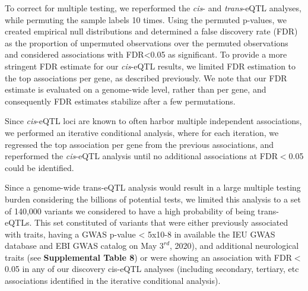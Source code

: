 To correct for multiple testing, we reperformed the \emph{cis}- and \emph{trans}-eQTL analyses, while permuting the sample labels 10 times. Using the permuted p-values, we created empirical null distributions and determined a false discovery rate (FDR) as the proportion of unpermuted observations over the permuted observations and considered associations with FDR<0.05 as significant. To provide a more stringent FDR estimate for our \emph{cis}-eQTL results, we limited FDR estimation to the top associations per gene, as described previously\cite{vosaUnravelingPolygenicArchitecture2018}. We note that our FDR estimate is evaluated on a genome-wide level, rather than per gene, and consequently FDR estimates stabilize after a few permutations\cite{westraSystematicIdentificationTrans2013}. 

Since \emph{cis}-eQTL loci are known to often harbor multiple independent associations, we performed an iterative conditional analysis, where for each iteration, we regressed the top association per gene from the previous associations, and reperformed the \emph{cis}-eQTL analysis until no additional associations at FDR$<$0.05 could be identified. 

Since a genome-wide trans-eQTL analysis would result in a large multiple testing burden considering the billions of potential tests, we limited this analysis to a set of 140,000 variants we considered to have a high probability of being trans-eQTLs. This set constituted of variants that were either previously associated with traits, having a GWAS p-value < 5x10-8 in available the IEU GWAS database\cite{lyonVariantCallFormat2020} and EBI GWAS catalog\cite{bunielloNHGRIEBIGWASCatalog2019} on May $3^{rd}$, 2020), and additional neurological traits (see \textbf{Supplemental Table 8}) or were showing an association with FDR$<$0.05 in any of our discovery cis-eQTL analyses (including secondary, tertiary, etc associations identified in the iterative conditional analysis). 

